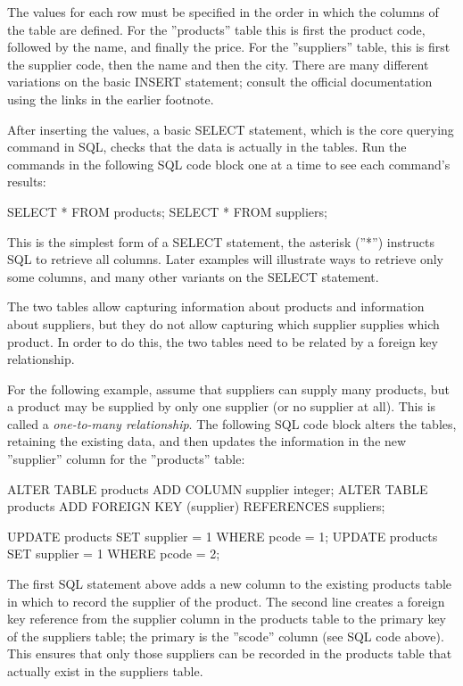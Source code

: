 The values for each row must be specified in the order in which the columns of the table are defined. For the ''products'' table this is first the product code, followed by the name, and finally the price. For the ''suppliers'' table, this is first the supplier code, then the name and then the city. There are many different variations on the basic INSERT statement; consult the official documentation using the links in the earlier footnote.

After inserting the values, a basic SELECT statement, which is the core querying command in SQL, checks that the data is actually in the tables. Run the commands in the following SQL code block one at a time to see each command's results:

\begin{samepage}
\begin{sqlcode}
SELECT * FROM products;
SELECT * FROM suppliers;
\end{sqlcode}
\end{samepage}

This is the simplest form of a SELECT statement, the asterisk (''*'') instructs SQL to retrieve all columns. Later examples will illustrate ways to retrieve only some columns, and many other variants on the SELECT statement.

The two tables allow capturing information about products and information about suppliers, but they do not allow capturing which supplier supplies which product. In order to do this, the two tables need to be related by a foreign key relationship. 

For the following example, assume that suppliers can supply many products, but a product may be supplied by only one supplier (or no supplier at all). This is called a \emph{one-to-many relationship}. The following SQL code block alters the tables, retaining the existing data, and then updates the information in the new ''supplier'' column for the ''products'' table:

\begin{samepage}
\begin{sqlcode}
ALTER TABLE products ADD COLUMN supplier integer;
ALTER TABLE products ADD FOREIGN KEY (supplier) REFERENCES suppliers;

UPDATE products SET supplier = 1 WHERE pcode = 1;
UPDATE products SET supplier = 1 WHERE pcode = 2;
\end{sqlcode}
\end{samepage}

The first SQL statement above adds a new column to the existing products table in which to record the supplier of the product. The second line creates a foreign key reference from the supplier column in the products table to the primary key of the suppliers table; the primary is the ''scode'' column (see SQL code above). This ensures that only those suppliers can be recorded in the products table that actually exist in the suppliers table. 


